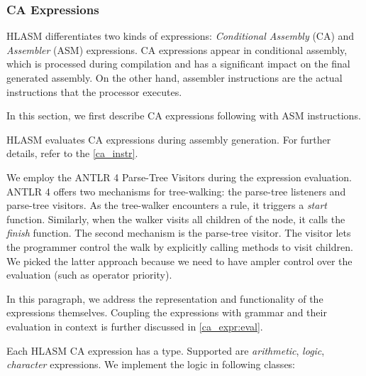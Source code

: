 \subsubsection{CA Expressions}
\label{ca_expr:logic}

HLASM differentiates two kinds of expressions: \emph{Conditional Assembly} (CA) and \emph{Assembler} (ASM) expressions. CA expressions appear in conditional assembly, which is processed during compilation and has a significant impact on the final generated assembly.
On the other hand, assembler instructions are the actual instructions that the processor executes.

In this section, we first describe CA expressions following with ASM instructions.



HLASM evaluates CA expressions during assembly generation. For further details, refer to the \cref{ca_instr}.

We employ the ANTLR 4 Parse-Tree Visitors during the expression evaluation. ANTLR 4 offers two mechanisms for tree-walking: the parse-tree listeners and parse-tree visitors. As the tree-walker encounters a rule, it triggers a \emph{start} function. Similarly, when the walker visits all children of the node, it calls the \emph{finish} function.  The second mechanism is the parse-tree visitor. The visitor lets the programmer control the walk by explicitly calling methods to visit children. We picked the latter approach because we need to have ampler control over the evaluation (such as operator priority).

In this paragraph, we address the representation and functionality of the expressions themselves. Coupling the expressions with grammar and their evaluation in context is further discussed in \cref{ca_expr:eval}.

Each HLASM CA expression has a type. Supported are \emph{arithmetic}, \emph{logic}, \emph{character} expressions. We implement the logic in following classes:

